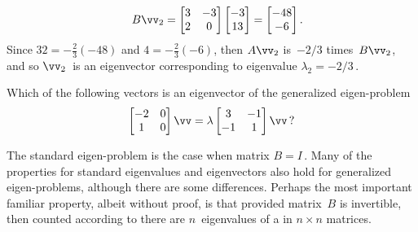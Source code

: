 \begin{example}
\begin{solution}
\begin{itemize}
\begin{align*}
&&B\vv_2=\begin{bmatrix} 3&-3\\2&0 \end{bmatrix}\begin{bmatrix} -3\\13 \end{bmatrix}
=\begin{bmatrix} -48\\-6 \end{bmatrix}.
\end{align*}
Since \(32=-\tfrac23(-48)\) and \(4=-\tfrac23(-6)\), then \(A\vv_2\) is~\(-2/3\) times~\(B\vv_2\), and so \(\vv_2\)~is an eigenvector corresponding to eigenvalue \(\lambda_2=-2/3\)\,.
\aqed

\end{itemize}
\end{solution}
\end{example}


\begin{activity}
Which of the following vectors is an eigenvector of the generalized eigen-problem
\begin{equation*}
\begin{bmatrix} -2&0\\1&0 \end{bmatrix}\vv=\lambda\begin{bmatrix} 3&-1\\-1&1 \end{bmatrix}\vv\,?
\end{equation*}
\end{activity}


The standard eigen-problem is the case when matrix \(B=I\)\,.
Many of the properties for standard eigenvalues and eigenvectors also hold for generalized eigen-problems, although there are some differences.
Perhaps the most important familiar property, albeit without proof, is that provided matrix~\(B\) is invertible, then counted according to  there are \(n\)~eigenvalues of a  in \(n\times n\) matrices.

